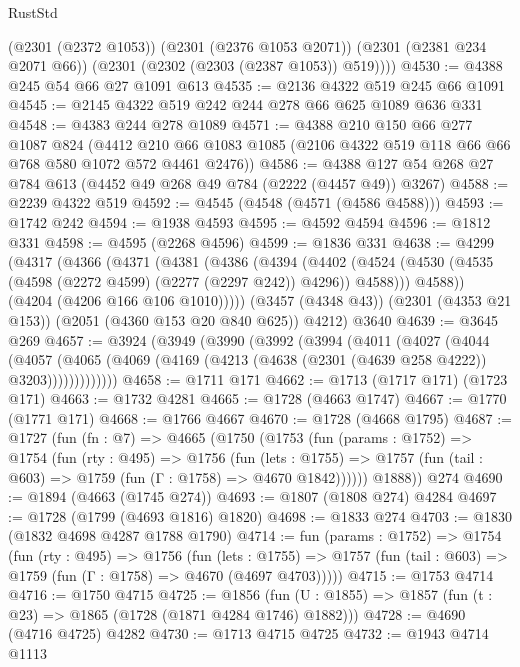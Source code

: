 \begin{lexlean}{RustStd}
\begin{coremodule}
        (@2301 (@2372 @1053))
        (@2301 (@2376 @1053 @2071))
        (@2301 (@2381 @234 @2071 @66))
        (@2301 (@2302 (@2303 (@2387 @1053)) @519))))
@4530 := @4388 @245 @54 @66 @27 @1091 @613
@4535 := @2136 @4322 @519 @245 @66 @1091
@4545 := @2145 @4322 @519 @242 @244 @278 @66 @625 @1089 @636 @331
@4548 := @4383 @244 @278 @1089
@4571 := @4388
    @210
    @150
    @66
    @277
    @1087
    @824
    (@4412 @210 @66 @1083 @1085 (@2106 @4322 @519 @118 @66 @66 @768 @580 @1072 @572 @4461 @2476))
@4586 := @4388 @127 @54 @268 @27 @784 @613 (@4452 @49 @268 @49 @784 (@2222 (@4457 @49)) @3267)
@4588 := @2239 @4322 @519
@4592 := @4545 (@4548 (@4571 (@4586 @4588)))
@4593 := @1742 @242
@4594 := @1938 @4593
@4595 := @4592 @4594
@4596 := @1812 @331
@4598 := @4595 (@2268 @4596)
@4599 := @1836 @331
@4638 := @4299
    (@4317
      (@4366
        (@4371
          (@4381
            (@4386
              (@4394
                (@4402
                  (@4524 (@4530 (@4535 (@4598 (@2272 @4599) (@2277 (@2297 @242)) @4296)) @4588)))
                @4588))
            (@4204 (@4206 @166 @106 @1010)))))
      (@3457 (@4348 @43))
      (@2301 (@4353 @21 @153))
      (@2051 (@4360 @153 @20 @840 @625))
      @4212)
    @3640
@4639 := @3645 @269
@4657 := @3924
    (@3949
      (@3990
        (@3992
          (@3994
            (@4011
              (@4027
                (@4044
                  (@4057
                    (@4065 (@4069 (@4169 (@4213 (@4638 (@2301 (@4639 @258 @4222)) @3203)))))))))))))
@4658 := @1711 @171
@4662 := @1713 (@1717 @171) (@1723 @171)
@4663 := @1732 @4281
@4665 := @1728 (@4663 @1747)
@4667 := @1770 (@1771 @171)
@4668 := @1766 @4667
@4670 := @1728 (@4668 @1795)
@4687 := @1727
    (fun (fn : @7) =>
    @4665
      (@1750
        (@1753
          (fun (params : @1752) =>
          @1754
            (fun (rty : @495) =>
            @1756
              (fun (lets : @1755) =>
              @1757 (fun (tail : @603) => @1759 (fun (Γ : @1758) => @4670 @1842))))))
        @1888))
    @274
@4690 := @1894 (@4663 (@1745 @274))
@4693 := @1807 (@1808 @274) @4284
@4697 := @1728 (@1799 (@4693 @1816) @1820)
@4698 := @1833 @274
@4703 := @1830 (@1832 @4698 @4287 @1788 @1790)
@4714 := fun (params : @1752) =>
  @1754
    (fun (rty : @495) =>
    @1756
      (fun (lets : @1755) =>
      @1757 (fun (tail : @603) => @1759 (fun (Γ : @1758) => @4670 (@4697 @4703)))))
@4715 := @1753 @4714
@4716 := @1750 @4715
@4725 := @1856 (fun (U : @1855) => @1857 (fun (t : @23) => @1865 (@1728 (@1871 @4284 @1746) @1882)))
@4728 := @4690 (@4716 @4725) @4282
@4730 := @1713 @4715 @4725
@4732 := @1943 @4714 @1113

\end{coremodule}
\end{lexlean}
